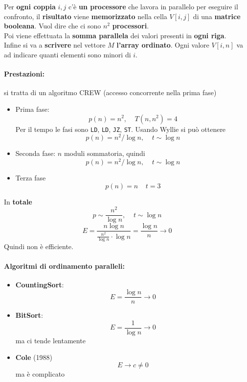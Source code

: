 \documentclass[11pt]{article}
\begin{document}
	Per \textbf{ogni coppia} $i,j$ c'è \textbf{un processore} che lavora in parallelo per eseguire il confronto, il \textbf{risultato} viene \textbf{memorizzato} nella cella $V[i,j]$ di una \textbf{matrice booleana}. Vuol dire che ci sono $n^2$ \textbf{processori}.\\
	Poi viene effettuata la \textbf{somma parallela} dei valori presenti in \textbf{ogni riga}.\\
	Infine si va a \textbf{scrivere} nel vettore $M$ \textbf{l'array ordinato}. Ogni valore $V[i,n]$ va ad indicare quanti elementi sono minori di $i$.\\
	
	\paragraph{Prestazioni:} si tratta di un algoritmo CREW (accesso concorrente nella prima fase)
	\begin{itemize}
		\item Prima fase: 
		$$ p(n) = n^2, \;\;\;\; T(n, n^2) = 4 $$
		Per il tempo le fasi sono \texttt{LD}, \texttt{LD}, \texttt{JZ}, \texttt{ST}. Usando Wyllie si può ottenere
		$$ p(n) = n^2/\log n, \;\;\;\; t \sim \log n $$
		
		\item Seconda fase: $n$ moduli sommatoria, quindi 
		$$ p(n) = n^2/\log n, \;\;\;\; t \sim \log n $$
		
		\item Terza fase 
		$$ p(n) = n \;\;\;\; t = 3 $$
	\end{itemize}
	
	In \textbf{totale}
	$$ p \sim \frac{n^2}{\log n}, \;\;\;\; t \sim \log n $$
	$$ E = \frac{n \log n}{\frac{n^2}{\log n} \cdot \log n}  = \frac{\log n}{n} \rightarrow 0 $$
	Quindi non è efficiente.\\
	
	\vfill
	
	\paragraph{Algoritmi di ordinamento paralleli: }
	\begin{itemize}
		\item \textbf{CountingSort}: 
		$$ E =  \frac{\log n}{n} \rightarrow 0 $$
		\item \textbf{BitSort}:
		$$ E = \frac{1}{\log n} \rightarrow 0 $$
		ma ci tende lentamente
		\item \textbf{Cole} (1988)
		$$ E \rightarrow c \neq 0 $$
		ma è complicato
	\end{itemize}
	
\end{document}
